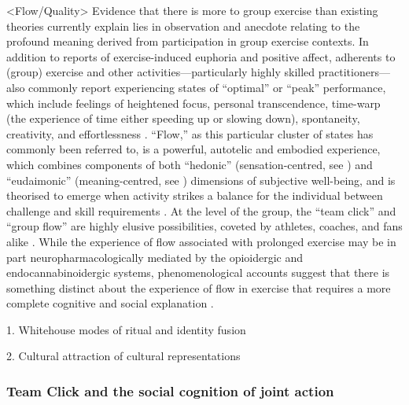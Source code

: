<Flow/Quality>
Evidence that there is more to group exercise than existing theories currently explain lies in observation and anecdote relating to the profound meaning derived from participation in group exercise contexts.  In addition to reports of exercise-induced euphoria and positive affect, adherents to (group) exercise and other activities---particularly highly skilled practitioners---also commonly report experiencing states of ``optimal'' or ``peak'' performance, which include feelings of heightened focus, personal transcendence, time-warp (the experience of time either speeding up or slowing down), spontaneity, creativity, and effortlessness \citep{Jackson1995a}.  ``Flow,'' as this particular cluster of states has commonly been referred to, is a powerful, autotelic and embodied experience, which combines components of both ``hedonic'' (sensation-centred, see \citep{Huta2010}) and ``eudaimonic'' (meaning-centred, see \cite{Ryff1989,Ryff2015}) dimensions of subjective well-being, and is theorised to emerge when activity strikes a balance for the individual between challenge and skill requirements \citep{Csikszentmihalyi1990,Abuhamdeh2012}.  At the level of the group, the ``team click'' and ``group flow'' are highly elusive possibilities, coveted by athletes, coaches, and fans alike \citep{Novak1993,Sawyer2006}.  While the experience of flow associated with prolonged exercise may be in part neuropharmacologically mediated by the opioidergic and endocannabinoidergic systems, phenomenological accounts suggest that there is something distinct about the experience of flow in exercise that requires a more complete cognitive and social explanation \citep{Dietrich2006,Dietrich2011}.




1. Whitehouse modes of ritual and identity fusion



2. Cultural attraction of cultural representations
















\subsubsection{Team Click and the social cognition of joint action}

